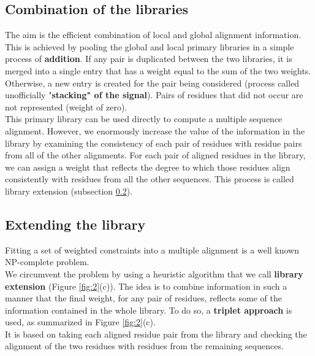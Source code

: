 \subsection{Combination of the libraries}
The aim is the efficient combination of local and global alignment information.
This is achieved by pooling the global and local primary libraries in a simple process of \textbf{addition}.
If any pair is duplicated between the two libraries, it is merged into a single entry that has a weight equal to the sum of the two weights.
Otherwise, a new entry is created for the pair being considered (process called unofficially "\textbf{stacking" of the signal}).
Pairs of residues that did not occur are not represented (weight of zero).
\\
This primary library can be used directly to compute a multiple sequence alignment.
However, we enormously increase the value of the information in the library by examining the consistency of each pair of residues with residue pairs from all of the other alignments.
For each pair of aligned residues in the library, we can assign a weight that reflects the degree to which those residues align consistently with residues from all the other sequences.
This process is called library extension (subsection \ref{sub:extension}).

\subsection{Extending the library} \label{sub:extension}
Fitting a set of weighted constraints into a multiple alignment is a well known NP-complete problem.
\\
We circumvent the problem by using a heuristic algorithm that we call \textbf{library extension} (Figure \ref{fig:2}(c)). The idea is to combine information in such a manner that the final weight, for any pair of residues, reflects some of the information contained in the whole library. To do so, a \textbf{triplet approach} is used, as summarized in Figure \ref{fig:2}(c).
\\
It is based on taking each aligned residue pair from the library and checking the alignment of the two residues with residues from the remaining sequences.
